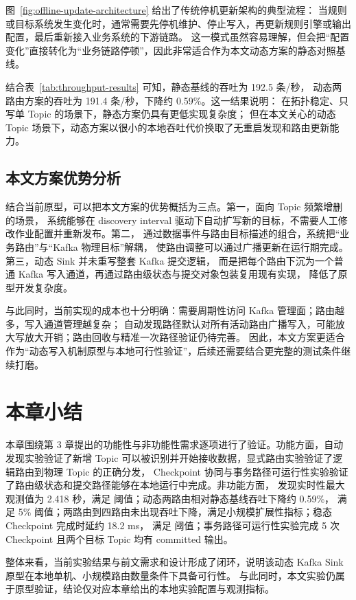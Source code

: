 图~\ref{fig:offline-update-architecture} 给出了传统停机更新架构的典型流程：
当规则或目标系统发生变化时，通常需要先停机维护、停止写入，再更新规则引擎或输出配置，最后重新接入业务系统的下游链路。
这一模式虽然容易理解，但会把“配置变化”直接转化为“业务链路停顿”，因此非常适合作为本文动态方案的静态对照基线。

结合表~\ref{tab:throughput-results} 可知，静态基线的吞吐为 192.5 条/秒，
动态两路由方案的吞吐为 191.4 条/秒，下降约 0.59\%。这一结果说明：
在拓扑稳定、只写单 Topic 的场景下，静态方案仍具有更低实现复杂度；
但在本文关心的动态 Topic 场景下，动态方案以很小的本地吞吐代价换取了无重启发现和路由更新能力。

\clearpage
\subsection{本文方案优势分析}

结合当前原型，可以把本文方案的优势概括为三点。第一，面向 Topic 频繁增删的场景，
系统能够在 discovery interval 驱动下自动扩写新的目标，不需要人工修改作业配置并重新发布。第二，
通过数据事件与路由目标描述的组合，系统把“业务路由”与“Kafka 物理目标”解耦，
使路由调整可以通过广播更新在运行期完成。第三，动态 Sink 并未重写整套 Kafka 提交逻辑，
而是把每个路由下沉为一个普通 Kafka 写入通道，再通过路由级状态与提交对象包装复用现有实现，
降低了原型开发复杂度。

与此同时，当前实现的成本也十分明确：需要周期性访问 Kafka 管理面；路由越多，写入通道管理越复杂；
自动发现路径默认对所有活动路由广播写入，可能放大写放大开销；路由回收与精准一次路径验证仍待完善。
因此，本文方案更适合作为“动态写入机制原型与本地可行性验证”，后续还需要结合更完整的测试条件继续打磨。

\section{本章小结}

本章围绕第 3 章提出的功能性与非功能性需求逐项进行了验证。功能方面，自动发现实验验证了新增 Topic
可以被识别并开始接收数据，显式路由实验验证了逻辑路由到物理 Topic 的正确分发，
Checkpoint 协同与事务路径可运行性实验验证了路由级状态和提交路径能够在本地运行中完成。非功能方面，
发现实时性最大观测值为 2.418 秒，满足  阈值；动态两路由相对静态基线吞吐下降约 0.59\%，
满足 5\% 阈值；两路由到四路由未出现吞吐下降，满足小规模扩展性指标；稳态 Checkpoint 完成时延约 18.2 ms，
满足  阈值；事务路径可运行性实验完成 5 次 Checkpoint 且两个目标 Topic 均有 committed 输出。

整体来看，当前实验结果与前文需求和设计形成了闭环，说明该动态 Kafka Sink 原型在本地单机、小规模路由数量条件下具备可行性。
与此同时，本文实验仍属于原型验证，结论仅对应本章给出的本地实验配置与观测指标。
